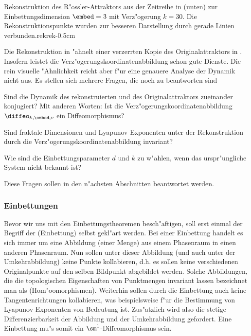 {
{Rekonstruktion des R"ossler-Attraktors aus der Zeitreihe in  (unten) zur
  Einbettungsdimension $\embed=3$ mit Verz"ogerung $k=30$. Die Rekonstruktionspunkte
  wurden zur besseren Darstellung durch gerade Linien verbunden.}{rekrek}{-0.5cm}}

Die Rekonstruktion in  "ahnelt einer verzerrten Kopie des
Originalattraktors in . Insofern leistet die
Verz"ogerungskoordinatenabbildung schon gute Dienste. Die rein visuelle "Ahnlichkeit
reicht aber f"ur eine genauere Analyse der Dynamik nicht aus. Es stellen sich mehrere
Fragen, die noch zu beantworten sind
\begin{myitemize}
\item Sind die Dynamik des rekonstruierten und des Originalattraktors zueinander
konjugiert? Mit anderen Worten: Ist die Verz"ogerungskoordinatenabbildung $\diffeo_{k,\embed,v}$
ein Diffeomorphismus?
\item Sind fraktale Dimensionen und Lyapunov-Exponenten unter der Rekonstruktion durch 
die Verz"ogerungskoordinatenabbildung invariant?
\item Wie sind die Einbettungsparameter $d$ und $k$ zu w"ahlen, wenn das urspr"ungliche
System nicht bekannt ist?
\end{myitemize}
Diese Fragen sollen in den n"achsten Abschnitten beantwortet werden.





\subsubsection{Einbettungen}

Bevor wir uns mit den Einbettungstheoremen besch"aftigen, soll erst einmal der Begriff der
\begriff(Einbettung) selbst gekl"art werden. Bei einer Einbettung handelt es sich immer um
eine Abbildung (einer Menge) aus einem Phasenraum in einen anderen Phasenraum. Nun sollen unter
dieser Abbildung (und auch unter der Umkehrabbildung) keine Punkte kollabieren, d.h. es
sollen keine verschiedenen Originalpunkte auf den selben Bildpunkt abgebildet werden.
Solche Abbildungen, die die topologischen Eigenschaften von Punktmengen invariant lassen
bezeichnet man als \begriff(Hom"oomorphismen). Weiterhin sollen durch die Einbettung auch
keine Tangentenrichtungen kollabieren, was beispielsweise f"ur die Bestimmung von
Lyapunov-Exponenten von Bedeutung ist.  Zus"atzlich wird also die stetige
Differenzierbarkeit der Abbildung und der Umkehrabbildung gefordert. Eine
Einbettung mu"s somit ein $\sm^1$-Diffeomorphismus sein.




